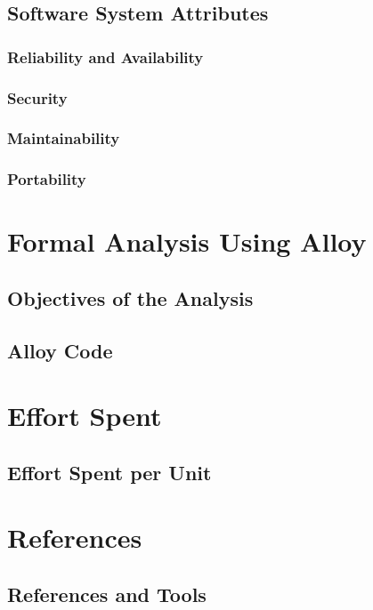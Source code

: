 \documentclass{article}
\begin{document}
\subsection{Software System Attributes}
\subsubsection{Reliability and Availability}
\subsubsection{Security}
\subsubsection{Maintainability}
\subsubsection{Portability}

\section{Formal Analysis Using Alloy}
\subsection{Objectives of the Analysis}
\subsection{Alloy Code}

\section{Effort Spent}
\subsection{Effort Spent per Unit}

\section{References}
\subsection{References and Tools}

\maketitle
\end{document}
